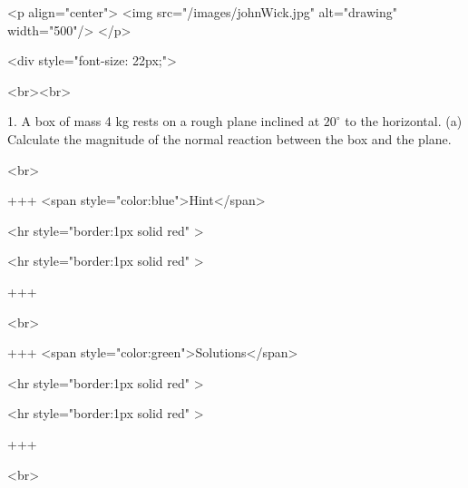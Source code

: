 <p align="center">
<img src="/images/johnWick.jpg" alt="drawing" width="500"/>
</p>

<div style="font-size: 22px;">

<br><br>

1. A box of mass 4 kg rests on a rough plane inclined at $20^{\circ}$ to the horizontal.
(a) Calculate the magnitude of the normal reaction between the box and the plane.

<br>

+++ <span style="color:blue">Hint</span>

<hr style="border:1px solid red" >

<hr style="border:1px solid red" >

+++

<br>

+++ <span style="color:green">Solutions</span>

<hr style="border:1px solid red" >

<hr style="border:1px solid red" >

+++

<br>

